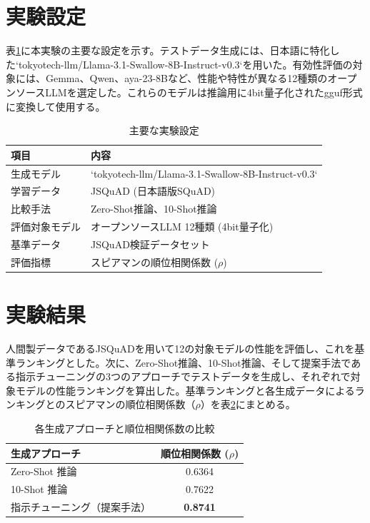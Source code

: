 \documentclass[a4paper,11pt]{jreport}
\begin{document}
\section{実験設定}
表\ref{tab:exp_setting}に本実験の主要な設定を示す。テストデータ生成には、日本語に特化した`tokyotech-llm/Llama-3.1-Swallow-8B-Instruct-v0.3`\cite{Fujii:COLM2024}を用いた。有効性評価の対象には、Gemma、Qwen、aya-23-8Bなど、性能や特性が異なる12種類のオープンソースLLMを選定した。これらのモデルは推論用に4bit量子化されたgguf形式に変換して使用する。

\begin{table}[h]
  \centering
  \caption{主要な実験設定}
  \label{tab:exp_setting}
  \begin{tabularx}{0.9\linewidth}{lX}
  \hline
  項目       & 内容 \\
  \hline
  生成モデル   & `tokyotech-llm/Llama-3.1-Swallow-8B-Instruct-v0.3` \\
  学習データ   & JSQuAD (日本語版SQuAD) \\
  比較手法   & Zero-Shot推論、10-Shot推論 \\
  評価対象モデル & オープンソースLLM 12種類 (4bit量子化) \\
  基準データ   & JSQuAD検証データセット \\
  評価指標     & スピアマンの順位相関係数 ($\rho$) \\
  \hline
  \end{tabularx}
\end{table}

\section{実験結果}
人間製データであるJSQuADを用いて12の対象モデルの性能を評価し、これを基準ランキングとした。次に、Zero-Shot推論、10-Shot推論、そして提案手法である指示チューニングの3つのアプローチでテストデータを生成し、それぞれで対象モデルの性能ランキングを算出した。基準ランキングと各生成データによるランキングとのスピアマンの順位相関係数（$\rho$）を表\ref{tab:rho_summary_main}にまとめる。

\begin{table}[h]
  \centering
  \caption{各生成アプローチと順位相関係数の比較}
  \label{tab:rho_summary_main}
  \begin{tabular}{lc}
  \hline
  生成アプローチ       & 順位相関係数 ($\rho$) \\
  \hline
  Zero-Shot 推論       & 0.6364 \\
  10-Shot 推論         & 0.7622 \\
  指示チューニング（提案手法） & \textbf{0.8741} \\
  \hline
  \end{tabular}
\end{table}
\end{document}
